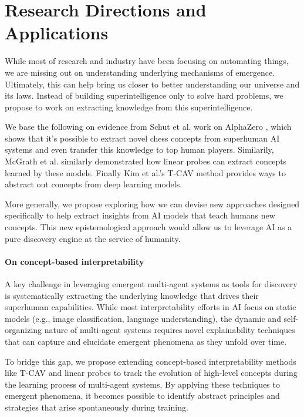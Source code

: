 \documentclass[11pt]{article}
\begin{document}
\section{Research Directions and Applications}
While most of research and industry have been focusing on automating things, we are missing out on understanding underlying mechanisms of emergence. Ultimately, this can help bring us closer to better understanding our universe and its laws.
Instead of building superintelligence only to solve hard problems, we propose to work on extracting knowledge from this superintelligence.

We base the following on evidence from Schut et al. work on AlphaZero \cite{schut}, which shows that it's possible to extract novel chess concepts from superhuman AI systems and even transfer this knowledge to top human players. Similarily, McGrath et al. \cite{alphazero-chess} similarly demonstrated how linear probes can extract concepts learned by these models. Finally Kim et al.'s T-CAV \cite{tcav} method provides ways to abstract out concepts from deep learning models. 

More generally, we propose exploring how we can devise new approaches designed specifically to help extract insights from AI models that teach humans new concepts.
This new epistemological approach would allow us to leverage AI as a pure discovery engine at the service of humanity.

\paragraph{On concept-based interpretability} A key challenge in leveraging emergent multi-agent systems as tools for discovery is systematically extracting the underlying knowledge that drives their superhuman capabilities. While most interpretability efforts in AI focus on static models (e.g., image classification, language understanding), the dynamic and self-organizing nature of multi-agent systems requires novel explainability techniques that can capture and elucidate emergent phenomena as they unfold over time.

To bridge this gap, we propose extending concept-based interpretability methods like T-CAV and linear probes to track the evolution of high-level concepts during the learning process of multi-agent systems. By applying these techniques to emergent phenomena, it becomes possible to identify abstract principles and strategies that arise spontaneously during training. 
\end{document}
